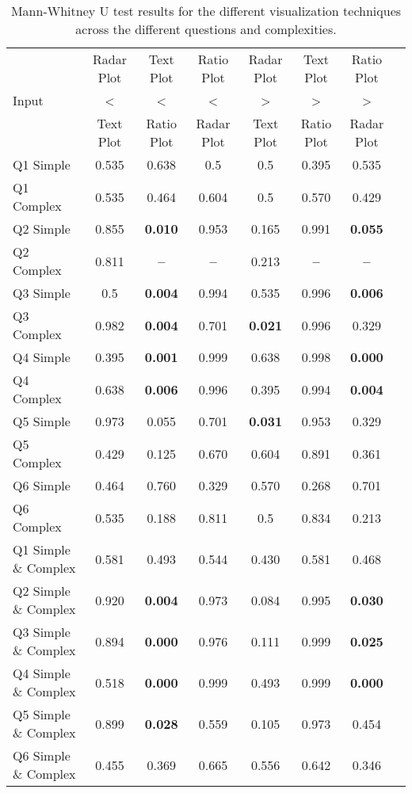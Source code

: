 \begin{table}[!htbp]
\centering
\begin{adjustbox}{width=1\textwidth}
\begin{tabular}{@{\extracolsep{4pt}}lccccccc}
\toprule   
   &  Radar Plot  & Text Plot  & Ratio Plot  & Radar Plot  & Text Plot  & Ratio Plot \\ 
Input & <  & <  & < & > & > & > \\
   &  Text Plot & Ratio Plot & Radar Plot & Text Plot & Ratio Plot & Radar Plot\\
\midrule
Q1 Simple  & 0.535 & 0.638 & 0.5 & 0.5 & 0.395 & 0.535\\ 
Q1 Complex & 0.535 & 0.464 & 0.604 & 0.5 & 0.570 & 0.429\\ 
Q2 Simple  &  0.855 & \textbf{0.010} & 0.953 & 0.165 & 0.991 & \textbf{0.055}\\ 
Q2 Complex & 0.811 & \textbf{--} & \textbf{--} & 0.213 & \textbf{--} & \textbf{--}\\ 
Q3 Simple  & 0.5 & \textbf{0.004} & 0.994 & 0.535 & 0.996 & \textbf{0.006}\\ 
Q3 Complex & 0.982  & \textbf{0.004} & 0.701 & \textbf{0.021} & 0.996 & 0.329\\ 
Q4 Simple & 0.395 & \textbf{0.001} &  0.999 & 0.638 & 0.998 & \textbf{0.000}\\ 
Q4 Complex & 0.638 & \textbf{0.006} & 0.996 & 0.395 & 0.994 &  \textbf{0.004}\\ 
Q5 Simple  & 0.973 & 0.055 & 0.701 & \textbf{0.031} & 0.953 & 0.329\\ 
Q5 Complex & 0.429 & 0.125 & 0.670 & 0.604 & 0.891 & 0.361\\ 
Q6 Simple  & 0.464 & 0.760 & 0.329 & 0.570 & 0.268 & 0.701\\ 
Q6 Complex & 0.535 & 0.188 &  0.811 & 0.5 & 0.834 & 0.213 \\ 
 \midrule
Q1 Simple \& Complex & 0.581 & 0.493 &  0.544 & 0.430 & 0.581 & 0.468\\ 
Q2 Simple \& Complex & 0.920 & \textbf{0.004} &  0.973 & 0.084 & 0.995 &  \textbf{0.030}\\ 
Q3 Simple \& Complex & 0.894 & \textbf{0.000} & 0.976 & 0.111 & 0.999 & \textbf{0.025}\\
Q4 Simple \& Complex & 0.518 & \textbf{0.000} &  0.999 & 0.493 & 0.999 & \textbf{0.000} \\
Q5 Simple \& Complex & 0.899 & \textbf{0.028} & 0.559 & 0.105 & 0.973 &  0.454\\
Q6 Simple \& Complex & 0.455 & 0.369 & 0.665 & 0.556 & 0.642 & 0.346\\
\bottomrule
\end{tabular}
\end{adjustbox}
\label{table:time}
\caption[Mann-Whitney U Test]{Mann-Whitney U test results for the different visualization techniques across the different questions and complexities.} 
\end{table}

